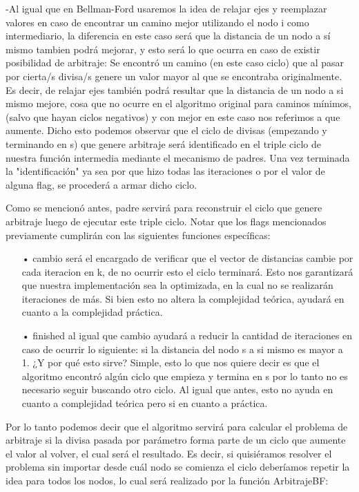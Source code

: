 \documentclass[11pt,a4paper]{article}
\begin{document}
-Al igual que en Bellman-Ford usaremos la idea de relajar ejes y reemplazar valores en caso de encontrar un camino mejor utilizando el nodo i como intermediario, la diferencia en este caso ser\'a que la distancia de un nodo a s\'i mismo tambien podr\'a mejorar, y esto ser\'a lo que ocurra en caso de existir posibilidad de arbitraje: Se encontr\'o un camino (en este caso ciclo) que al pasar por cierta/s divisa/s genere un valor mayor al que se encontraba originalmente. Es decir, de relajar ejes tambi\'en podr\'a resultar que la distancia de un nodo a si mismo mejore, cosa que no ocurre en el algoritmo original para caminos m\'inimos, (salvo que hayan ciclos negativos) y con mejor en este caso nos referimos a que aumente. Dicho esto podemos observar que el ciclo de divisas (empezando y terminando en s) que genere arbitraje ser\'a identificado en el triple ciclo de nuestra funci\'on intermedia mediante el mecanismo de padres. Una vez terminada la "identificaci\'on" ya sea por que hizo todas las iteraciones o por el valor de alguna flag, se proceder\'a a armar dicho ciclo.


Como se mencion\'o antes, padre servir\'a para reconstruir el ciclo que genere arbitraje luego de ejecutar este triple ciclo. Notar que los flags mencionados previamente cumplir\'an con las siguientes funciones espec\'ificas:
\begin{itemize}
    \item[•] cambio ser\'a el encargado de verificar que el vector de distancias cambie por cada iteracion en k, de  no ocurrir esto el ciclo terminar\'a. Esto nos garantizar\'a que nuestra implementaci\'on sea la optimizada, en la cual no se realizar\'an iteraciones de m\'as. Si bien esto no altera la complejidad te\'orica, ayudar\'a en cuanto a la complejidad pr\'actica.
    \item[•] finished al igual que cambio ayudar\'a a reducir la cantidad de iteraciones en caso de ocurrir lo siguiente: si la distancia del nodo s a si mismo es mayor a 1. ¿Y por qu\'e esto sirve? Simple, esto lo que nos quiere decir es que el algoritmo encontr\'o alg\'un ciclo que empieza y termina en s por lo tanto no es necesario seguir buscando otro ciclo. Al igual que antes, esto no ayuda en cuanto a complejidad te\'orica pero si en cuanto a pr\'actica.
\end{itemize}


Por lo tanto podemos decir que el algoritmo servir\'a para calcular el problema de arbitraje si la divisa pasada por par\'ametro forma parte de un ciclo que aumente el valor al volver, el cual ser\'a el resultado. Es decir, si quisi\'eramos resolver el problema sin importar desde cu\'al nodo se comienza el ciclo deber\'iamos repetir la idea para todos los nodos, lo cual ser\'a realizado por la funci\'on ArbitrajeBF:
\end{document}

